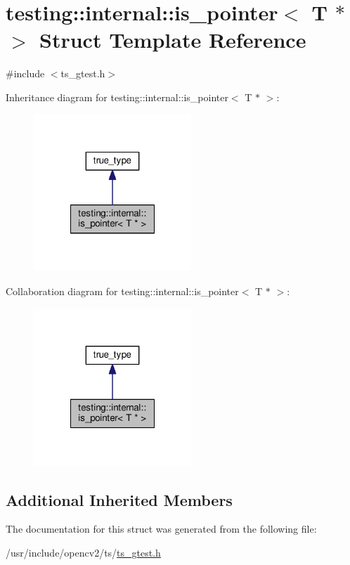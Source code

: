 \hypertarget{structtesting_1_1internal_1_1is__pointer_3_01T_01_5_01_4}{\section{testing\-:\-:internal\-:\-:is\-\_\-pointer$<$ T $\ast$ $>$ Struct Template Reference}
\label{structtesting_1_1internal_1_1is__pointer_3_01T_01_5_01_4}
}


{\ttfamily \#include $<$ts\-\_\-gtest.\-h$>$}



Inheritance diagram for testing\-:\-:internal\-:\-:is\-\_\-pointer$<$ T $\ast$ $>$\-:\nopagebreak
\begin{figure}[H]
\begin{center}
\leavevmode
\includegraphics[width=168pt]{structtesting_1_1internal_1_1is__pointer_3_01T_01_5_01_4__inherit__graph}
\end{center}
\end{figure}


Collaboration diagram for testing\-:\-:internal\-:\-:is\-\_\-pointer$<$ T $\ast$ $>$\-:\nopagebreak
\begin{figure}[H]
\begin{center}
\leavevmode
\includegraphics[width=168pt]{structtesting_1_1internal_1_1is__pointer_3_01T_01_5_01_4__coll__graph}
\end{center}
\end{figure}
\subsection*{Additional Inherited Members}


The documentation for this struct was generated from the following file\-:\begin{DoxyCompactItemize}
\item 
/usr/include/opencv2/ts/\hyperlink{ts__gtest_8h}{ts\-\_\-gtest.\-h}\end{DoxyCompactItemize}
